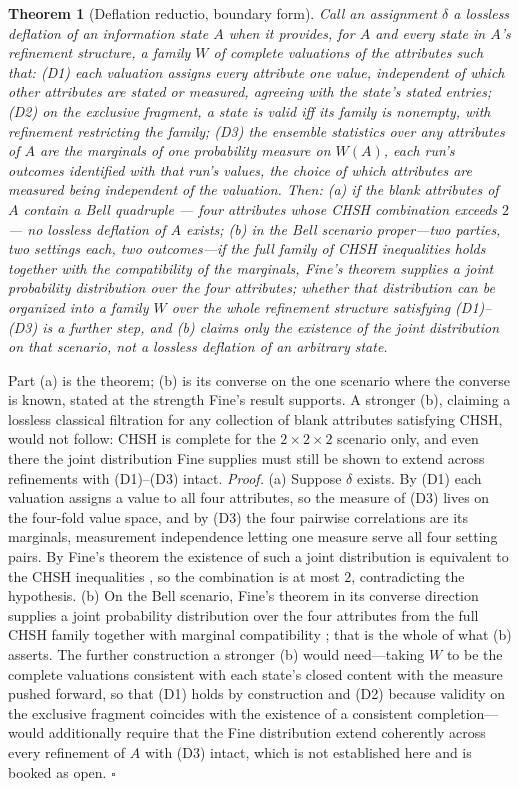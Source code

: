 \documentclass[11pt]{article}
\newtheorem{theorem}{Theorem}
\begin{document}
\begin{theorem}[Deflation reductio, boundary form]\label{thm:reductio}
Call an assignment $\delta$ a \emph{lossless deflation} of an information state $A$ when it provides, for $A$ and every state in $A$'s refinement structure, a family $W$ of complete valuations of the attributes such that: (D1) each valuation assigns every attribute one value, independent of which other attributes are stated or measured, agreeing with the state's stated entries; (D2) on the exclusive fragment, a state is valid iff its family is nonempty, with refinement restricting the family; (D3) the ensemble statistics over any attributes of $A$ are the marginals of one probability measure on $W(A)$, each run's outcomes identified with that run's values, the choice of which attributes are measured being independent of the valuation. Then: (a) if the blank attributes of $A$ contain a Bell quadruple --- four attributes whose CHSH combination exceeds $2$ --- no lossless deflation of $A$ exists; (b) in the Bell scenario proper---two parties, two settings each, two outcomes---if the full family of CHSH inequalities holds together with the compatibility of the marginals, Fine's theorem supplies a joint probability distribution over the four attributes; whether that distribution can be organized into a family $W$ over the whole refinement structure satisfying (D1)--(D3) is a further step, and (b) claims only the existence of the joint distribution on that scenario, not a lossless deflation of an arbitrary state.
\end{theorem}
\noindent Part (a) is the theorem; (b) is its converse on the one scenario where the converse is known, stated at the strength Fine's result supports. A stronger (b), claiming a lossless classical filtration for any collection of blank attributes satisfying CHSH, would not follow: CHSH is complete for the $2 \times 2 \times 2$ scenario only, and even there the joint distribution Fine supplies must still be shown to extend across refinements with (D1)--(D3) intact.
\noindent\textit{Proof.} (a) Suppose $\delta$ exists. By (D1) each valuation assigns a value to all four attributes, so the measure of (D3) lives on the four-fold value space, and by (D3) the four pairwise correlations are its marginals, measurement independence letting one measure serve all four setting pairs. By Fine's theorem the existence of such a joint distribution is equivalent to the CHSH inequalities \cite{fine1982hidden, pitowsky1994george}, so the combination is at most $2$, contradicting the hypothesis. (b) On the Bell scenario, Fine's theorem in its converse direction supplies a joint probability distribution over the four attributes from the full CHSH family together with marginal compatibility \cite{fine1982hidden}; that is the whole of what (b) asserts. The further construction a stronger (b) would need---taking $W$ to be the complete valuations consistent with each state's closed content with the measure pushed forward, so that (D1) holds by construction and (D2) because validity on the exclusive fragment coincides with the existence of a consistent completion---would additionally require that the Fine distribution extend coherently across every refinement of $A$ with (D3) intact, which is not established here and is booked as open. \hfill$\square$
\end{document}
